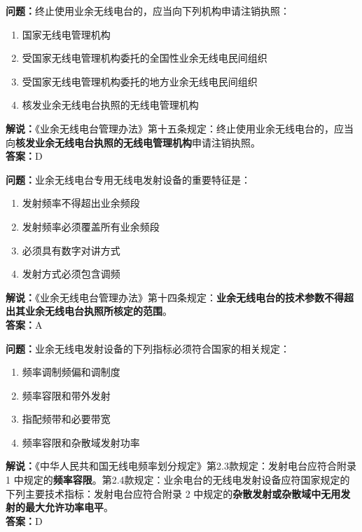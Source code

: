 \bigskip


\noindent\textbf{问题：}终止使用业余无线电台的，应当向下列机构申请注销执照：
\begin{enumerate}[label=\Alph*), leftmargin=3em]
\item 国家无线电管理机构
\item 受国家无线电管理机构委托的全国性业余无线电民间组织
\item 受国家无线电管理机构委托的地方业余无线电民间组织
\item 核发业余无线电台执照的无线电管理机构
\end{enumerate}
\noindent\textbf{解说：}《业余无线电台管理办法》第十五条规定：终止使用业余无线电台的，应当向\textbf{核发业余无线电台执照的无线电管理机构}申请注销执照。\\\noindent\textbf{答案：}D




\bigskip


\noindent\textbf{问题：}业余无线电台专用无线电发射设备的重要特征是：
\begin{enumerate}[label=\Alph*), leftmargin=3em]
\item 发射频率不得超出业余频段
\item 发射频率必须覆盖所有业余频段
\item 必须具有数字对讲方式
\item 发射方式必须包含调频
\end{enumerate}
\noindent\textbf{解说：}《业余无线电台管理办法》第十四条规定：\textbf{业余无线电台的技术参数不得超出其业余无线电台执照所核定的范围}。\\\noindent\textbf{答案：}A



\bigskip


\noindent\textbf{问题：}业余无线电发射设备的下列指标必须符合国家的相关规定：
\begin{enumerate}[label=\Alph*), leftmargin=3em]
\item 频率调制频偏和调制度
\item 频率容限和带外发射
\item 指配频带和必要带宽
\item 频率容限和杂散域发射功率
\end{enumerate}
\noindent\textbf{解说：}《中华人民共和国无线电频率划分规定》第2.3款规定：发射电台应符合附录 1 中规定的\textbf{频率容限}。第2.4款规定：业余电台的无线电发射设备应符国家规定的下列主要技术指标：发射电台应符合附录 2 中规定的\textbf{杂散发射或杂散域中无用发射的最大允许功率电平}。\\\noindent\textbf{答案：}D






